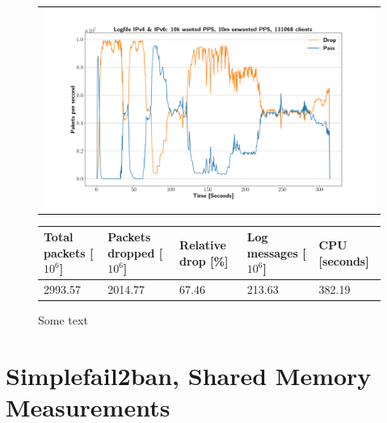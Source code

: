 \begin{figure}[p]
	\label{fig:simplefail2ban:disk:ip46:10m}
	\centering
	\scriptsize
	\begin{tabular}{c}
    	\centerline{\includegraphics[width=1.2\textwidth]{images/simplefail2ban_disk_ipv46_v10k_iv10m_c131068.png}}
	\end{tabular}
	\begin{tabular}{lllll}
		\toprule
		\textbf{Total packets [$10^6$]} & \textbf{Packets dropped [$10^6$]} & \textbf{Relative drop [\%]} & \textbf{Log messages [$10^6$]} & \textbf{CPU [seconds]} \\ \midrule 
		2993.57 & 2014.77 & 67.46 & 213.63 & 382.19 \\
		\bottomrule
	\end{tabular}
	\caption[Simplefail2ban, Logfile IPv4 \& IPv6, 10m \ac{PPS}]{Some text}
\end{figure}

\section{Simplefail2ban, Shared Memory Measurements}

